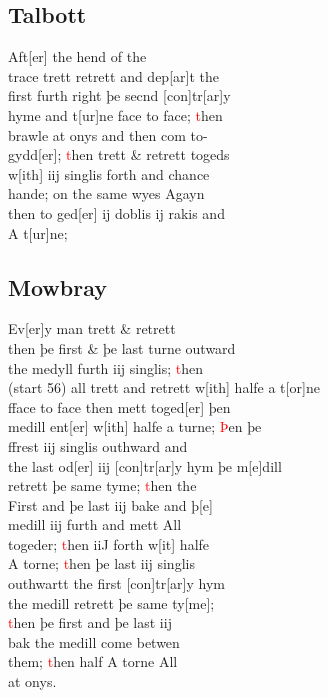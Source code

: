 \documentclass[12pt,letter]{article} %
\newcommand{\red}[1]{\textcolor{red}{#1}}
\newcommand{\srcpg}[1]{(start #1)}
\begin{document}
    \subsection{Talbott}
Aft{[}er{]} the hend of the \\ 
trace trett retrett and dep{[}ar{]}t the \\ 
first furth right þe secnd {[}con{]}tr{[}ar{]}y \\ 
hyme and t{[}ur{]}ne face to face; \red{t}hen \\ 
brawle at onys and then com to-\\ 
gydd{[}er{]}; \red{t}hen trett \& retrett togeds \\ 
w{[}ith{]} iij singlis forth and chance \\
hande; on the same wyes Agayn \\ 
then to ged{[}er{]} ij doblis ij rakis and \\ 
A t{[}ur{]}ne;

    \subsection{Mowbray}
Ev{[}er{]}y man trett \& retrett \\ 
then þe first \& þe last turne outward \\ 
the medyll furth iij singlis; \red{t}hen \\ 
\srcpg{56} all trett and retrett w{[}ith{]} halfe a t{[}or{]}ne \\ 
fface to face then mett toged{[}er{]} þen \\
medill ent{[}er{]} w{[}ith{]} halfe a turne; \red{Þ}en þe \\
 ffrest iij singlis outhward and \\
the last od{[}er{]} iij {[}con{]}tr{[}ar{]}y hym þe m{[}e{]}dill \\ 
retrett þe same tyme; \red{t}hen the \\
First and þe last iij bake and þ[e] \\
medill iij furth and mett All \\ 
togeder; \red{t}hen iiJ forth w{[}it{]} halfe \\ 
A torne; \red{t}hen þe last iij singlis \\ 
outhwartt the first {[}con{]}tr{[}ar{]}y hym \\ 
the medill retrett þe same ty[me]; \\ 
\red{t}hen þe first and þe last iij \\
bak the medill come betwen \\ 
them; \red{t}hen half A torne All \\ at onys.
\end{document}
